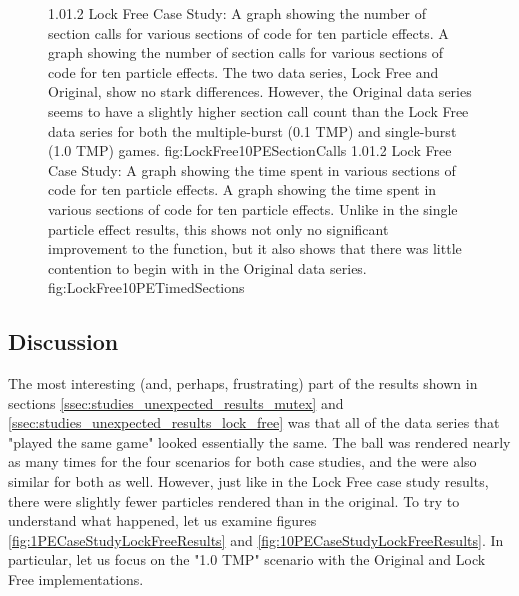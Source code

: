 \begin{figure}
\addtocounter{figure}{-1}
	\vspace{-1.5cm}
	{1.0}{1.2}
	{Lock Free Case Study: A graph showing the number of section calls for various sections of code for ten particle effects.}
	{A graph showing the number of section calls for various sections of code for ten particle effects. The two data series, Lock Free and Original, show no stark differences. However, the Original data series seems to have a slightly higher section call count than the Lock Free data series for both the multiple-burst (0.1 TMP) and single-burst (1.0 TMP) games. }
	{fig:LockFree10PESectionCalls}
	\vspace{-1.5cm}
	{1.0}{1.2}
	{Lock Free Case Study: A graph showing the time spent in various sections of code for ten particle effects.}
	{A graph showing the time spent in various sections of code for ten particle effects. Unlike in the single particle effect results, this shows not only no significant improvement to the  function, but it also shows that there was little contention to begin with in the Original data series.}
	{fig:LockFree10PETimedSections}

\end{figure}

\newpage

\subsection{Discussion}\label{ssec:studies_unexpected_results_discussion}

The most interesting (and, perhaps, frustrating) part of the results shown in sections \ref{ssec:studies_unexpected_results_mutex} and \ref{ssec:studies_unexpected_results_lock_free} was that all of the data series that "played the same game" looked essentially the same. The ball was rendered nearly as many times for the four scenarios for both case studies, and the  were also similar for both as well. However, just like in the Lock Free case study results, there were slightly fewer particles rendered than in the original. To try to understand what happened, let us examine figures \ref{fig:1PECaseStudyLockFreeResults} and \ref{fig:10PECaseStudyLockFreeResults}. In particular, let us focus on the "1.0 TMP" scenario with the Original and Lock Free implementations.

